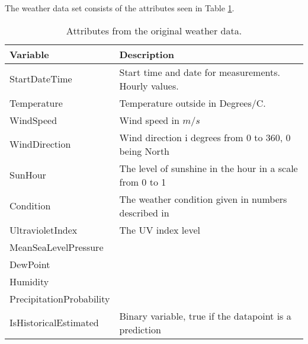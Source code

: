 \noindent The weather data set consists of the attributes seen in Table \ref{tab: weatherdata}.
\begin{table}[H]
    \centering
    \begin{tabular}{ll}
     \hline
     \textbf{Variable} & \textbf{Description} \\
    \hline
    \hline
    StartDateTime  &  Start time and date for measurements. Hourly values.\\
    Temperature  &  Temperature outside in Degrees/C. \\
    WindSpeed  & Wind speed in $m/s$\\
    WindDirection  & Wind direction i degrees from 0 to 360, 0 being North \\
    SunHour  & The level of sunshine in the hour in a scale from 0 to 1 \\
    Condition  & The weather condition given in numbers described in \cite{condition} \\
    UltravioletIndex  & The UV index level \\
    MeanSeaLevelPressure  &  \\
    DewPoint  &  \\
    Humidity  &  \\
    PrecipitationProbability & \\
    IsHistoricalEstimated & Binary variable, true if the datapoint is a prediction \\
    \hline
    \end{tabular}
    \caption{Attributes from the original weather data.}
    \label{tab: weatherdata}
\end{table}   

